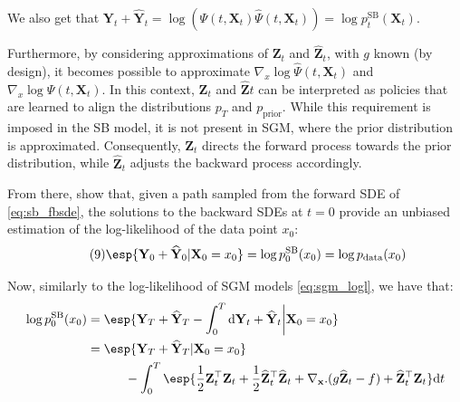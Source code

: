 \documentclass{article}
\begin{document}
We also get that $\mathbf{Y}_t + \widehat{\mathbf{Y}}_t = \log(\Psi(t,\mathbf{X}_t)\widehat\Psi(t,\mathbf{X}_t)) = \log p_t^\mathrm{SB}(\mathbf{X}_t)$.

Furthermore, by considering approximations of $\mathbf{Z}_t$ and $\widehat{\mathbf{Z}}_t$, with $g$ known (by design), it becomes possible to approximate $\nabla_x\log\widehat\Psi(t,\mathbf{X}_t)$ and $\nabla_x\log\Psi(t,\mathbf{X}_t)$. In this context, $\mathbf{Z}_t$ and $\widehat{\mathbf{Z}}t$ can be interpreted as policies that are learned to align the distributions $p_T$ and $p_\mathrm{prior}$. While this requirement is imposed in the SB model, it is not present in SGM, where the prior distribution is approximated. Consequently, $\mathbf{Z}_t$ directs the forward process towards the prior distribution, while $\widehat{\mathbf{Z}}_t$ adjusts the backward process accordingly.

From there, \cite{chen2023likelihood} show that, given a path sampled from the forward
SDE of \eqref{eq:sb_fbsde}, the solutions to the backward SDEs at $t = 0$ provide an unbiased estimation of the log-likelihood of the data point $x_0$:
\begin{equation}\label{9}\tag{9}
    \esp{\mathbf{Y}_0 + \widehat{\mathbf{Y}}_0|\mathbf{X}_0 = x_0} =
    \log p_0^\mathrm{SB}(x_0) =
    \log p_{\rm data}(x_0)
\end{equation}

Now, similarly to the log-likelihood of SGM models \eqref{eq:sgm_logl}, we have that:
\begin{align}
    \log p_0^\mathrm{SB}(x_0)
    &= \esp{\mathbf{Y}_T + \widehat{\mathbf{Y}}_T - \int_0^T \dint \mathbf{Y}_t + \mathbf{\widehat{Y}}_t\bigg\rvert\mathbf{X}_0 = x_0} \notag \\
    &= \esp{\mathbf{Y}_T + \widehat{\mathbf{Y}}_T|\mathbf{X}_0 = x_0}  \\
    & \quad \quad \quad - \int_0^T \esp{
    \frac{1}{2}\mathbf{Z}_t^\top\mathbf{Z}_t
    + \frac{1}{2}\widehat{\mathbf{Z}}_t^\top\widehat{\mathbf{Z}}_t
    + \nabla_\mathbf{x} . (g\widehat{\mathbf{Z}}_t - f)
    + \widehat{\mathbf{Z}}_t^\top \mathbf{Z}_t
    }
    \dint t \notag
\end{align}
\end{document}
